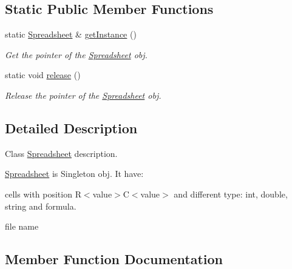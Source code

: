 \subsection*{Static Public Member Functions}
\begin{DoxyCompactItemize}
\item 
\mbox{\label{class_spreadsheet_a128c4e331142e6e5bad870cb5b2e1917}} 
static \hyperlink{class_spreadsheet}{Spreadsheet} \& \hyperlink{class_spreadsheet_a128c4e331142e6e5bad870cb5b2e1917}{get\+Instance} ()
\begin{DoxyCompactList}\small\item\em Get the pointer of the \hyperlink{class_spreadsheet}{Spreadsheet} obj. \end{DoxyCompactList}\item 
\mbox{\label{class_spreadsheet_aa7ca5fb8133d735022684dc11271c71a}} 
static void \hyperlink{class_spreadsheet_aa7ca5fb8133d735022684dc11271c71a}{release} ()
\begin{DoxyCompactList}\small\item\em Release the pointer of the \hyperlink{class_spreadsheet}{Spreadsheet} obj. \end{DoxyCompactList}\end{DoxyCompactItemize}


\subsection{Detailed Description}
Class \hyperlink{class_spreadsheet}{Spreadsheet} description. 

\hyperlink{class_spreadsheet}{Spreadsheet} is Singleton obj. It have\+:
\begin{DoxyItemize}
\item cells with position R$<$value$>$C$<$value$>$ and different type\+: int, double, string and formula.
\item file name 
\end{DoxyItemize}

\subsection{Member Function Documentation}
\mbox{\label{class_spreadsheet_a5c0f7b4ebd4da1741a662fe595f32cbc}} 
